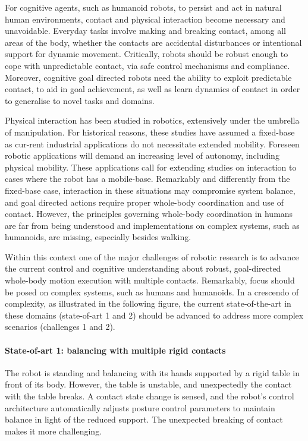 \documentclass[final,5p,twocolumn]{elsarticle}
\begin{document}
For cognitive agents, such as humanoid robots, to persist and act in natural human environments, contact and physical interaction become necessary and unavoidable. Everyday tasks involve making and breaking contact, among all areas of the body, whether the contacts are accidental disturbances or intentional support for dynamic movement. Critically, robots should be robust enough to cope with unpredictable contact, via safe control mechanisms and compliance.  Moreover, cognitive goal directed robots need the ability to exploit predictable contact, to aid in goal achievement, as well as learn dynamics of contact in order to generalise to novel tasks and domains.

Physical interaction has been studied in robotics, extensively under the umbrella of manipulation. For historical reasons, these studies have assumed a fixed-base as cur-rent industrial applications do not necessitate extended mobility. Foreseen robotic applications will demand an increasing level of autonomy, including physical mobility. These applications call for extending studies on interaction to cases where the robot has a mobile-base. Remarkably and differently from the fixed-base case, interaction in these situations may compromise system balance, and goal directed actions require proper whole-body coordination and use of contact. However, the principles governing whole-body coordination in humans are far from being understood and implementations on complex systems, such as humanoids, are missing, especially besides walking.

Within this context one of the major challenges of robotic research is to advance the current control and cognitive understanding about robust, goal-directed whole-body motion execution with multiple contacts. Remarkably, focus should be posed on complex systems, such as humans and humanoids. In a crescendo of complexity, as illustrated in the following figure, the current state-of-the-art in these domains (state-of-art 1 and 2) should be advanced to address more complex scenarios (challenges 1 and 2).

\paragraph{State-of-art 1: balancing with multiple rigid contacts} The robot is standing and balancing with its hands supported by a rigid table in front of its body. However, the table is unstable, and unexpectedly the contact with the table breaks. A contact state change is sensed, and the robot's control architecture automatically adjusts posture control parameters to maintain balance in light of the reduced support. The unexpected breaking of contact makes it more challenging.
\end{document}
